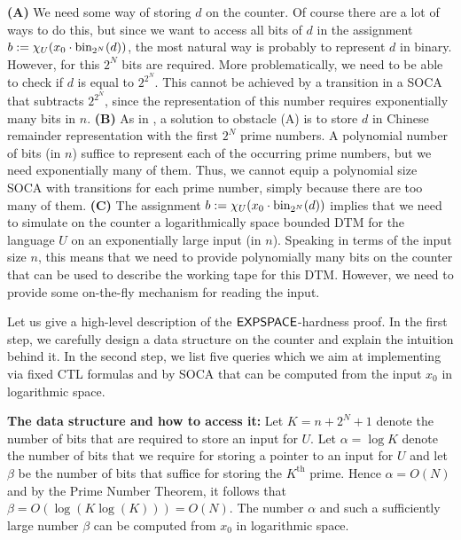 \documentclass[times,envcountsame]{llncs}
\begin{document}
\textbf{(A)} We need some way of storing $d$ on the counter. Of course
there are a lot of ways to do this, but since we want to access
all bits of $d$ in the assignment $b:=\chi_U(x_0\cdot \text{bin}_{2^N}(d))$, the most
natural way is probably to represent $d$ in binary.
However, for this $2^N$ bits are required.
 More problematically, we need to be able to check if $d$ is equal to
$2^{2^N}$. This cannot be achieved by a transition in a SOCA
 that subtracts $2^{2^N}$, since the representation of this number
requires exponentially many bits in $n$.
\textbf{(B)} As in \cite{GoLo10}, a solution to obstacle (A) is to store $d$ in
Chinese remainder representation with the first $2^N$ prime numbers.
A polynomial number of bits (in $n$) suffice
to represent each of the occurring prime numbers, but
we need exponentially many of them.
Thus, we cannot equip a polynomial size SOCA with transitions for
each prime number, simply because there are too many of them.
\textbf{(C)}
The assignment $b:=\chi_U(x_0\cdot \text{bin}_{2^N}(d))$ implies that we need to simulate on
the counter a logarithmically space bounded DTM for the language $U$
on an exponentially
large input (in $n$).
Speaking in terms of the input size $n$, this means that we need to provide
polynomially many bits on the counter that can be used to describe the
working tape for this DTM. However, we need to provide
some on-the-fly mechanism for reading the input.

\noindent
Let us give a high-level description of the ${\mathsf{EXPSPACE}}$-hardness proof.
In the first step, we carefully design a data structure on the counter
and explain the intuition behind it.
In the second step, we list five queries which we aim at implementing via
fixed CTL formulas and by SOCA that can be computed from the input $x_0$
in logarithmic space.

\smallskip

\noindent
{\bf The data structure and how to access it: }
 Let $K=n+2^N+1$ denote the number of bits that are required to store an input
for $U$.
Let $\alpha=\log K$ denote the number of bits that we require for
storing a pointer to an input for $U$ and let $\beta$
be the number of bits that suffice for storing the
$K^{\text{th}}$ prime. Hence $\alpha=O(N)$ and by
the Prime Number Theorem, it follows that
$\beta= O(\log(K\log(K)))=O(N)$.
The number $\alpha$ and such a sufficiently large number $\beta$ can be computed
 from $x_0$ in logarithmic space.
\end{document}
